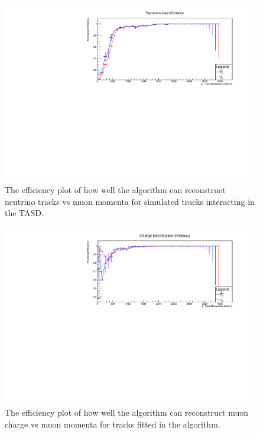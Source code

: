 \begin{figure}[h!]
\centering
\includegraphics[width=.9\textwidth]{figures/NeutrinoChap/Neutrino/NuStormRecEff.pdf}
\caption{The efficiency plot of how well the algorithm can reconstruct neutrino tracks vs muon momenta for simulated tracks interacting in the TASD.}
\label{fig:T2KTASDfitted}
\end{figure}

\begin{figure}[h!]
\centering
\includegraphics[width=.9\textwidth]{figures/NeutrinoChap/Neutrino/NuStormChargeEff.pdf}
\caption{The efficiency plot of how well the algorithm can reconstruct muon charge vs muon momenta for tracks fitted in the algorithm.}
\label{fig:T2KTASDfittedcharge}
\end{figure}

